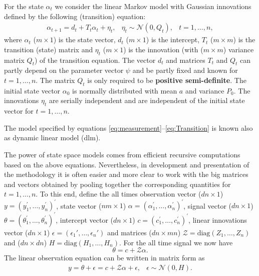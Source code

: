 \documentclass{article}
\begin{document}
For the state $\alpha_t$ we consider the linear Markov model with Gaussian innovations
defined by the following (transition) equation:
\begin{equation}
  \begin{array}{rccl}
    \alpha_{t+1}  =  d_t + T_t \alpha_t + \eta_t, & \eta_t \sim \mathcal{N}(0,Q_t),
    & t=1,\dots,n,
  \end{array}
  \label{eq:Transition}
\end{equation}
where $\alpha_t$ ($m \times 1$) is the state vector, $d_t$ ($m \times 1$) is the intercept,
$T_t$ ($m \times m$) is the 
transition (state)
matrix and $\eta_t$ ($m \times 1$) is the innovation (with ($m \times m$) variance matrix
$Q_t$) of the transition equation. The vector $d_t$ and matrices $T_t$ and $Q_t$ can partly
depend on the parameter vector $\psi$ and be partly fixed and known for $t=1,\dots, n$. The
matrix $Q_t$ is only required to be \textbf{positive semi-definite}. The initial state vector
$\alpha_{0}$ 
is normally distributed with mean $a$ and variance $P_{0}$. The innovations $\eta_t$ are
serially independent and are independent of the initial state vector for $t=1,\dots, n$.




The model specified by equations \eqref{eq:measurement}--\eqref{eq:Transition} is known also
as dynamic linear model (dlm).

The power of state space models comes from efficient recursive computations based on the above
equations. Nevertheless, in development and presentation of the methodology it is often easier
and more clear to work with the big matrices and vectors obtained by pooling together the
corresponding quantities for $t=1,\dots,n$.
To this end, define
the all times
observation vector ($dn \times 1$) $y=(y_1^\prime,\dots,y_n^\prime)^\prime$,
state vector ($ nm \times 1 $) $\alpha=(\alpha_1^\prime,\dots,\alpha_n^\prime)^\prime$,
signal vector ($dn \times 1$) $\theta=(\theta_1^\prime,\dots,\theta_n^\prime)^\prime$,
intercept vector ($dn \times 1$) $c=(c_1^\prime,\dots,c_n^\prime)^\prime$,
linear innovations vector ($dn \times 1$) $\epsilon = (\epsilon_{1}',\dots,\epsilon_{n}')$
and
matrices ($dn \times mn$) $\mathcal{Z}= \text{diag}(Z_1,\dots,Z_n)$
and ($dn \times dn$)  $H=\text{diag}(H_1,\dots,H_n)$.
For the all time signal we now have
\begin{equation*}
  \theta = c + \mathcal{Z} \alpha
  .
\end{equation*}
The linear observation equation can be written in matrix form as
\begin{equation}
  \begin{array}{rcl}
    y = \theta + \epsilon
      =  c + \mathcal{Z} \alpha + \epsilon
      , & \epsilon \sim \mathcal{N}(0,H) %
    .
  \end{array}
  \label{eq:measurementVec}
\end{equation}
\end{document}

